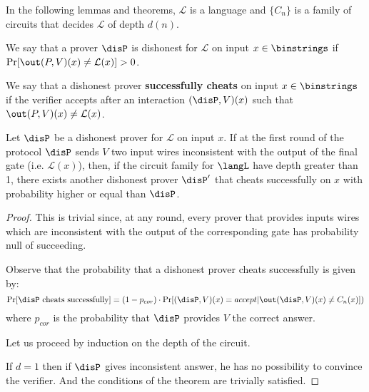 In the following lemmas and theorems, $\mathcal{L}$ is a language and $\{C_n\}$ 
is a family of circuits that decides $\mathcal{L}$ of depth $d(n)$.

\begin{mydef}
We say that a prover $\disP$ is dishonest for $\mathcal{L}$ on input  $x \in 
\binstrings$ if $\Pr[\out(P,V)(x) \neq \mathcal{L}(x)] > 0$.

We say that a dishonest prover \textbf{successfully cheats} on input $x \in \binstrings$ if the verifier accepts after an interaction $(\disP, V)(x)$ such that $\out(P,V)(x) \neq \mathcal{L}(x)$.
\end{mydef}




 
\begin{mylemma}
Let $\disP$ be a dishonest prover for $\mathcal{L}$ on input $x$. If at the 
first round of the protocol $\disP$ sends $V$ two input wires inconsistent with 
the output of the final gate (i.e. $\mathcal{L}(x)$), then, if the circuit 
family for $\langL$ have depth greater than 1, there exists another 
dishonest prover $\disP'$ that cheats successfully on $x$ with probability 
higher or equal than $\disP$.
\end{mylemma}
\begin{proof}
This is trivial since, at any round, every prover that provides 
inputs wires which are inconsistent with the output of the corresponding gate 
has probability null of succeeding.

Observe that the probability that a dishonest prover cheats successfully is 
given by:
$$ \Pr[\disP \mbox{ cheats successfully}] = (1-p_{cor})\cdot\Pr[(\disP, V)(x) = 
accept | \out(\disP,V)(x)  \neq C_n(x)])  $$ 
where $p_{cor}$ is the probability that $\disP$ provides $V$ the correct answer.

Let us proceed by induction on the depth of the circuit.

If $d =1$ then if $\disP$ gives inconsistent answer, he has no possibility to 
convince the verifier. And the conditions of the theorem are trivially 
satisfied.

\end{proof}

